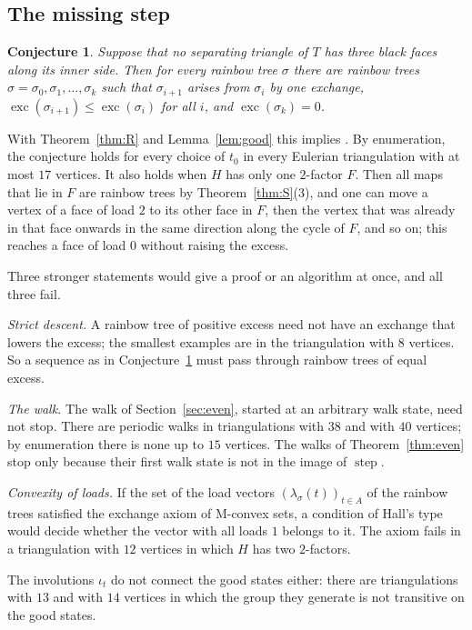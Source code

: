 \documentclass[10pt]{amsart}
\numberwithin{equation}{section}
\newtheorem{conjecture}[equation]{Conjecture}
\theoremstyle{definition}
\theoremstyle{remark}
\newcommand{\exc}{\operatorname{exc}}
\newcommand{\step}{\operatorname{step}}
\begin{document}
\subsection*{The missing step}

\begin{conjecture}\label{conj:X}
Suppose that no separating triangle of $T$ has three black faces along its inner side.
Then for every rainbow tree $\sigma$ there are rainbow trees $\sigma=\sigma_0,\sigma_1,\dots,\sigma_k$ such that $\sigma_{i+1}$ arises from $\sigma_i$ by one exchange, $\exc(\sigma_{i+1})\le\exc(\sigma_i)$ for all $i$, and $\exc(\sigma_k)=0$.
\end{conjecture}

With Theorem~\ref{thm:R} and Lemma~\ref{lem:good} this implies \cite[Proposition~6.9]{Paper}.
By enumeration, the conjecture holds for every choice of $t_0$ in every Eulerian triangulation with at most $17$ vertices.
It also holds when $H$ has only one $2$-factor $F$.
Then all maps that lie in $F$ are rainbow trees by Theorem~\ref{thm:S}(3), and one can move a vertex of a face of load $2$ to its other face in $F$, then the vertex that was already in that face onwards in the same direction along the cycle of $F$, and so on; this reaches a face of load $0$ without raising the excess.

Three stronger statements would give a proof or an algorithm at once, and all three fail.

\emph{Strict descent.}
A rainbow tree of positive excess need not have an exchange that lowers the excess; the smallest examples are in the triangulation with $8$ vertices.
So a sequence as in Conjecture~\ref{conj:X} must pass through rainbow trees of equal excess.

\emph{The walk.}
The walk of Section~\ref{sec:even}, started at an arbitrary walk state, need not stop.
There are periodic walks in triangulations with $38$ and with $40$ vertices; by enumeration there is none up to $15$ vertices.
The walks of Theorem~\ref{thm:even} stop only because their first walk state is not in the image of $\step$.

\emph{Convexity of loads.}
If the set of the load vectors $(\lambda_\sigma(t))_{t\in A}$ of the rainbow trees satisfied the exchange axiom of M-convex sets, a condition of Hall's type would decide whether the vector with all loads $1$ belongs to it.
The axiom fails in a triangulation with $12$ vertices in which $H$ has two $2$-factors.

The involutions $\iota_t$ do not connect the good states either: there are triangulations with $13$ and with $14$ vertices in which the group they generate is not transitive on the good states.
\end{document}
